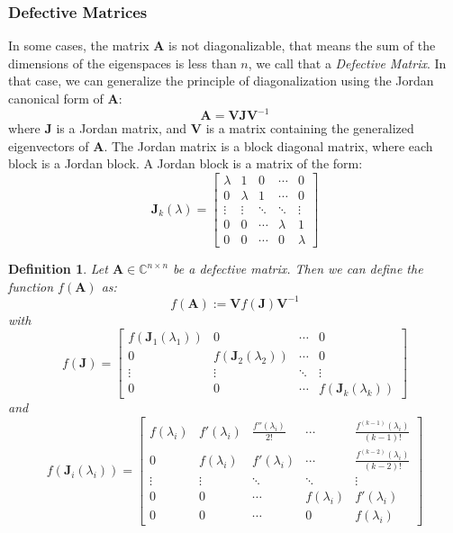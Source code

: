 \documentclass[11pt]{article}
\newtheorem{definition}{Definition}[section]
\numberwithin{equation}{section}
\begin{document}
\subsubsection*{Defective Matrices}
In some cases, the matrix $\mathbf{A}$ is not diagonalizable, that means the sum of the dimensions of the eigenspaces is less than $n$, we call that a \textit{Defective Matrix}. In that case, we can generalize the principle of diagonalization using the Jordan canonical form of $\mathbf{A}$:
\begin{equation}
    \mathbf{A} = \mathbf{V}\mathbf{J}\mathbf{V}^{-1}
\end{equation}
where $\mathbf{J}$ is a Jordan matrix, and $\mathbf{V}$ is a matrix containing the generalized eigenvectors of $\mathbf{A}$. The Jordan matrix is a block diagonal matrix, where each block is a Jordan block. A Jordan block is a matrix of the form:
\begin{equation}
    \mathbf{J}_k(\lambda) = \begin{bmatrix}
        \lambda & 1 & 0 & \cdots & 0 \\
        0 & \lambda & 1 & \cdots & 0 \\
        \vdots & \vdots & \ddots & \ddots & \vdots \\
        0 & 0 & \cdots & \lambda & 1 \\
        0 & 0 & \cdots & 0 & \lambda
    \end{bmatrix}
\end{equation}
\begin{definition}\label{thm:jordan}
    Let $\mathbf{A}\in\mathbb{C}^{n\times n}$ be a defective matrix. Then we can define the function $f(\mathbf{A})$ as:
    \begin{equation}
        f(\mathbf{A}) := \mathbf{V}f(\mathbf{J})\mathbf{V}^{-1}
    \end{equation}
    with 
    \begin{equation}
        f(\mathbf{J}) = \begin{bmatrix}
            f(\mathbf{J}_1(\lambda_1)) & 0 & \cdots & 0 \\
            0 & f(\mathbf{J}_2(\lambda_2)) & \cdots & 0 \\
            \vdots & \vdots & \ddots & \vdots \\
            0 & 0 & \cdots & f(\mathbf{J}_k(\lambda_k))
        \end{bmatrix}
    \end{equation}
    and \begin{equation}
        f(\mathbf{J}_i(\lambda_i)) = \begin{bmatrix}
            f(\lambda_i) & f'(\lambda_i) & \frac{f''(\lambda_i)}{2!} & \cdots & \frac{f^{(k-1)}(\lambda_i)}{(k-1)!} \\
            0 & f(\lambda_i) & f'(\lambda_i) & \cdots & \frac{f^{(k-2)}(\lambda_i)}{(k-2)!} \\
            \vdots & \vdots & \ddots & \ddots & \vdots \\
            0 & 0 & \cdots & f(\lambda_i) & f'(\lambda_i) \\
            0 & 0 & \cdots & 0 & f(\lambda_i)
        \end{bmatrix}
    \end{equation}
\end{definition}
\end{document}
